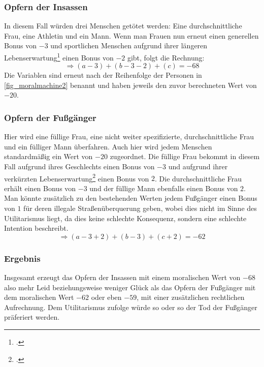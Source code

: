 \documentclass[a4paper, 12pt, openany]{book}
\begin{document}
                \subsubsection*{Opfern der Insassen}
                    In diesem Fall würden drei Menschen getötet werden: Eine durchschnittliche Frau, eine Athletin und ein Mann. Wenn man Frauen nun erneut einen generellen Bonus von $-3$ und sportlichen Menschen aufgrund ihrer längeren Lebenserwartung\footcite[70]{gola2005adipositas} einen Bonus von $-2$ gibt, folgt die Rechnung:
                    $$\Rightarrow (a - 3) + (b - 3 - 2) + (c) = -68$$
                    Die Variablen sind erneut nach der Reihenfolge der Personen in \autoref{fig_moralmachine2} benannt und haben jeweils den zuvor berechneten Wert von $-20$.
                    
                \subsubsection*{Opfern der Fußgänger}
                    Hier wird eine füllige Frau, eine nicht weiter spezifizierte, durchschnittliche Frau und ein fülliger Mann überfahren. Auch hier wird jedem Menschen standardmäßig ein Wert von $-20$ zugeordnet. Die füllige Frau bekommt in diesem Fall aufgrund ihres Geschlechts einen Bonus von $-3$ und aufgrund ihrer verkürzten Lebenserwartung\footcite[70]{gola2005adipositas} einen Bonus von $2$. Die durchschnittliche Frau erhält einen Bonus von $-3$ und der füllige Mann ebenfalls einen Bonus von $2$. Man könnte zusätzlich zu den bestehenden Werten jedem Fußgänger einen Bonus von $1$ für deren illegale Straßenüberquerung geben, wobei dies nicht im Sinne des Utilitarismus liegt, da dies keine schlechte Konsequenz, sondern eine schlechte Intention beschreibt.
                    $$\Rightarrow (a - 3 + 2) + (b - 3) + (c + 2) = -62$$
                
                \subsubsection*{Ergebnis}
                    Insgesamt erzeugt das Opfern der Insassen mit einem moralischen Wert von $-68$ also mehr Leid beziehungsweise weniger Glück als das Opfern der Fußgänger mit dem moralischen Wert $-62$ oder eben $-59$, mit einer zusätzlichen rechtlichen Aufrechnung. Dem Utilitarismus zufolge würde so oder so der Tod der Fußgänger präferiert werden.
            
\end{document}
